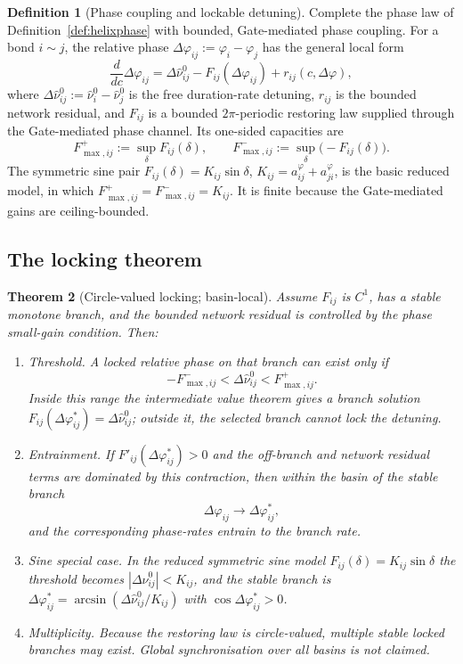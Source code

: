 \documentclass[11pt,a4paper]{article}
\newcommand{\cint}{\ensuremath{\mathfrak c}}
\def\mathfrak#1{#1}%
\def\emph#1{#1}%
\theoremstyle{definition}
\newtheorem{definition}{Definition}[section]
\theoremstyle{plain}
\newtheorem{theorem}[definition]{Theorem}
\theoremstyle{remark}
\begin{document}
\begin{definition}[Phase coupling and lockable detuning]\label{def:phasecoupling}
Complete the phase law of Definition~\ref{def:helixphase} with bounded, Gate-mediated phase
coupling. For a bond \(i\sim j\), the relative phase
\(\Delta\varphi_{ij}:=\varphi_i-\varphi_j\) has the general local form
\[
\frac{d}{d\cint}\Delta\varphi_{ij}
=
\Delta\hat\nu_{ij}^{0}
-
F_{ij}(\Delta\varphi_{ij})
+
r_{ij}(\cint,\Delta\varphi),
\]
where \(\Delta\hat\nu_{ij}^{0}:=\hat\nu_i^0-\hat\nu_j^0\) is the free duration-rate
detuning, \(r_{ij}\) is the bounded network residual, and \(F_{ij}\) is a bounded
\(2\pi\)-periodic restoring law supplied through the Gate-mediated phase channel. Its
one-sided capacities are
\[
F^+_{\max,ij}:=\sup_\delta F_{ij}(\delta),
\qquad
F^-_{\max,ij}:=\sup_\delta\bigl(-F_{ij}(\delta)\bigr).
\]
The symmetric sine pair
\(F_{ij}(\delta)=K_{ij}\sin\delta\), \(K_{ij}=a_{ij}^{\varphi}+a_{ji}^{\varphi}\), is the
basic reduced model, in which \(F^+_{\max,ij}=F^-_{\max,ij}=K_{ij}\). It is finite because the
Gate-mediated gains are ceiling-bounded.
\end{definition}

\subsection{The locking theorem}

\begin{theorem}[Circle-valued locking; basin-local]\label{thm:phaselock}
Assume \(F_{ij}\) is \(C^1\), has a stable monotone branch, and the bounded network residual
is controlled by the phase small-gain condition. Then:
\begin{enumerate}[label=\textup{(\alph*)},leftmargin=1.2cm]
\item \emph{Threshold.} A locked relative phase on that branch can exist only if
\[
-F^-_{\max,ij}
<
\Delta\hat\nu_{ij}^{0}
<
F^+_{\max,ij}.
\]
Inside this range the intermediate value theorem gives a branch solution
\(F_{ij}(\Delta\varphi_{ij}^{*})=\Delta\hat\nu_{ij}^{0}\); outside it, the selected branch
cannot lock the detuning.
\item \emph{Entrainment.} If \(F'_{ij}(\Delta\varphi_{ij}^{*})>0\) and the off-branch and
network residual terms are dominated by this contraction, then within the basin of the stable
branch
\[
\Delta\varphi_{ij}\to\Delta\varphi_{ij}^{*},
\]
and the corresponding phase-rates entrain to the branch rate.
\item \emph{Sine special case.} In the reduced symmetric sine model
\(F_{ij}(\delta)=K_{ij}\sin\delta\) the threshold becomes
\(|\Delta\hat\nu_{ij}^{0}|<K_{ij}\), and the stable branch is
\(\Delta\varphi_{ij}^{*}=\arcsin(\Delta\hat\nu_{ij}^{0}/K_{ij})\) with
\(\cos\Delta\varphi_{ij}^{*}>0\).
\item \emph{Multiplicity.} Because the restoring law is circle-valued, multiple stable locked
branches may exist. Global synchronisation over all basins is not claimed.
\end{enumerate}
\end{theorem}
\end{document}
